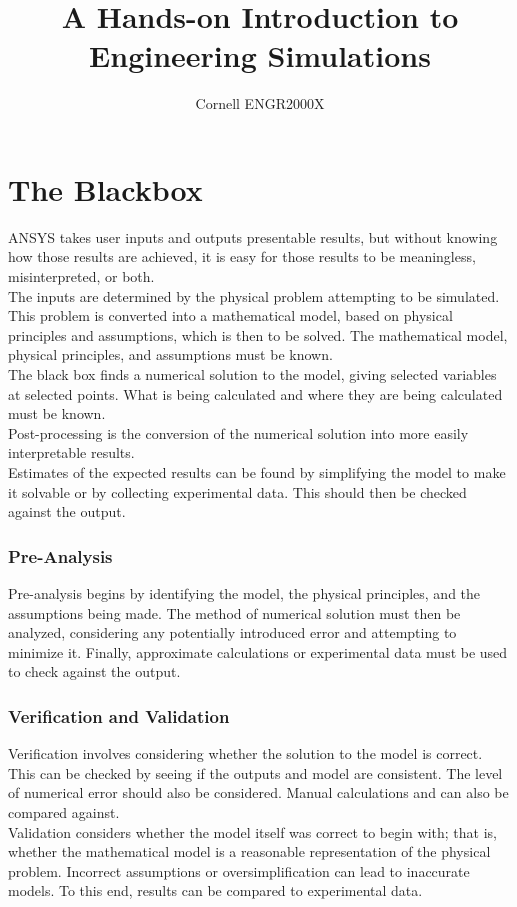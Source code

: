 \documentclass{article}
\title{A Hands-on Introduction to Engineering Simulations}
\author{Cornell ENGR2000X}
\begin{document}
	\maketitle
	\tableofcontents
	\newpage
	\section{The Blackbox}
		ANSYS takes user inputs and outputs presentable results, but without knowing how those results are achieved, it is easy for those results to be meaningless, misinterpreted, or both. \\
		The inputs are determined by the physical problem attempting to be simulated. This problem is converted into a mathematical model, based on physical principles and assumptions, which is then to be solved. The mathematical model, physical principles, and assumptions must be known. \\
		The black box finds a numerical solution to the model, giving selected variables at selected points. What is being calculated and where they are being calculated must be known. \\
		Post-processing is the conversion of the numerical solution into more easily interpretable results. \\
		Estimates of the expected results can be found by simplifying the model to make it solvable or by collecting experimental data. This should then be checked against the output.
		\subsubsection*{Pre-Analysis}
			Pre-analysis begins by identifying the model, the physical principles, and the assumptions being made. The method of numerical solution must then be analyzed, considering any potentially introduced error and attempting to minimize it. Finally, approximate calculations or experimental data must be used to check against the output.
		\subsubsection*{Verification and Validation}
			Verification involves considering whether the solution to the model is correct. This can be checked by seeing if the outputs and model are consistent. The level of numerical error should also be considered. Manual calculations and can also be compared against. \\
			Validation considers whether the model itself was correct to begin with; that is, whether the mathematical model is a reasonable representation of the physical problem. Incorrect assumptions or oversimplification can lead to inaccurate models. To this end, results can be compared to experimental data.
\end{document}
